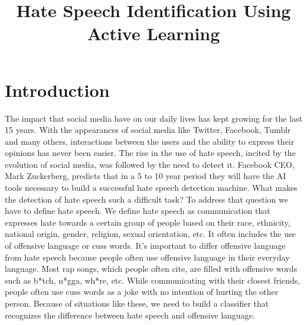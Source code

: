 \documentclass[10pt, a4paper]{article}
\title{Hate Speech Identification Using Active Learning}
\begin{document}
\maketitleabstract

\section{Introduction}
\begin{table}[t!]
	\centering
	\caption{First row shows the original tweet post from dataset, the second row shows cleaned, tokenized and steammed tweet post}
	\label{tbl:prepData}
\end{table}

The impact that social media have on our daily lives has kept growing for the last 15 years. With the appearances of social media like Twitter, Facebook, Tumblr and many others, interactions between the users and the ability to express their opinions has never been easier. The rise in the use of hate speech, incited by the evolution of social media, was followed by the need to detect it. Facebook CEO, Mark Zuckerberg, predicts that in a 5 to 10 year period they will have the AI tools necessary to build a successful hate speech detection machine. What makes the detection of hate speech such a difficult task? To address that question we have to define hate speech. We define hate speech as communication that expresses hate towards a certain group of people based on their race, ethnicity, national origin, gender, religion, sexual orientation, etc. It often includes the use of offensive language or cuss words. It's important to differ offensive language from hate speech because people often use offensive language in their everyday language. Most rap songs, which people often cite, are filled with offensive words such as b*tch, n*gga, wh*re, etc. While communicating with their closest friends, people often use cuss words as a joke with no intention of hurting the other person. Because of situations like these, we need to build a classifier that recognizes the difference between hate speech and offensive language. 
\end{document}
